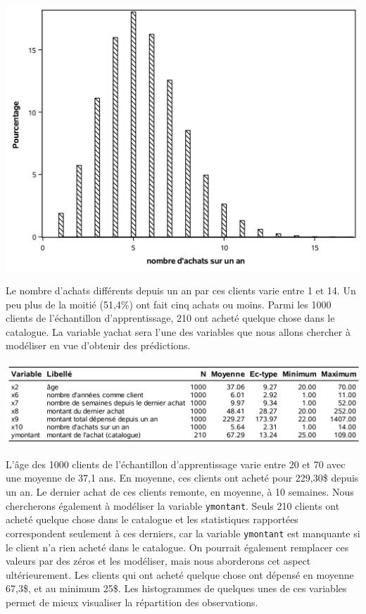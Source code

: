 \documentclass[
  11pt,
  letterpaper,
]{book}
\theoremstyle{definition}
\theoremstyle{definition}
\theoremstyle{definition}
\theoremstyle{definition}
\theoremstyle{remark}
\begin{document}
\begin{center}\includegraphics[width=0.9\linewidth]{figures/02-select-e4} \end{center}

Le nombre d'achats différents depuis un an par ces clients varie entre 1 et 14. Un peu plus de la moitié (51,4\%) ont fait cinq achats ou moins. Parmi les 1000 clients de l'échantillon d'apprentissage, 210 ont acheté quelque chose dans le catalogue. La variable yachat sera l'une des variables que nous allons chercher à modéliser en vue d'obtenir des prédictions.

\begin{center}\includegraphics[width=0.9\linewidth]{figures/02-select-e5} \end{center}

L'âge des 1000 clients de l'échantillon d'apprentissage varie entre 20 et 70 avec une moyenne de 37,1 ans. En moyenne, ces clients ont acheté pour 229,30\$ depuis un an. Le dernier achat de ces clients remonte, en moyenne, à 10 semaines. Nous chercherons également à modéliser la variable \texttt{ymontant}. Seuls 210 clients ont acheté quelque chose dans le catalogue et les statistiques rapportées correspondent seulement à ces derniers, car la variable \texttt{ymontant} est manquante si le client n'a rien acheté dans le catalogue. On pourrait également remplacer ces valeurs par des zéros et les modéliser, mais nous aborderons cet aspect ultérieurement. Les clients qui ont acheté quelque chose ont dépensé en moyenne 67,3\$, et au minimum 25\$. Les histogrammes de quelques unes de ces variables permet de mieux visualiser la répartition des observations.
\end{document}
